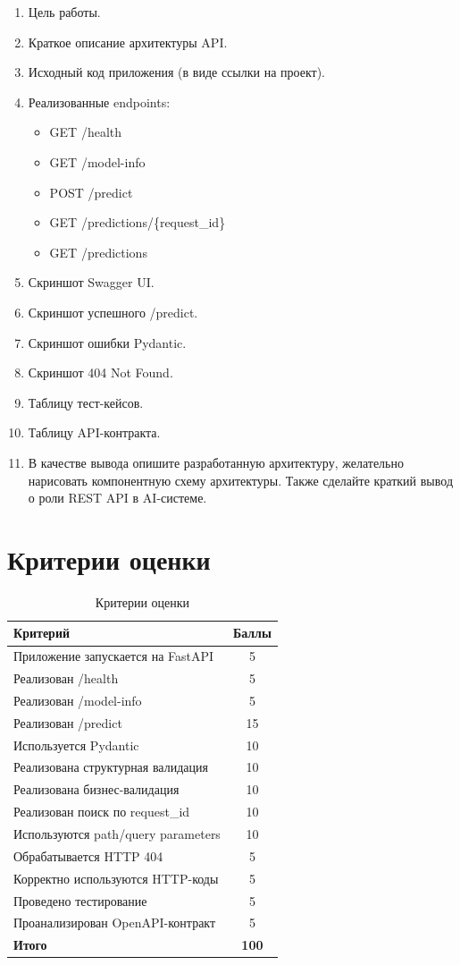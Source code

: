 \documentclass[12pt,a4paper]{article}
\begin{document}
\begin{enumerate}
    \item Цель работы.
    \item Краткое описание архитектуры API.
    \item Исходный код приложения (в виде ссылки на проект).
    \item Реализованные endpoints:
    \begin{itemize}
        \item GET /health
        \item GET /model-info
        \item POST /predict
        \item GET /predictions/\{request\_id\}
        \item GET /predictions
    \end{itemize}
    \item Скриншот Swagger UI.
    \item Скриншот успешного /predict.
    \item Скриншот ошибки Pydantic.
    \item Скриншот 404 Not Found.
    \item Таблицу тест-кейсов.
    \item Таблицу API-контракта.
    \item В качестве вывода опишите разработанную архитектуру, желательно нарисовать компонентную схему архитектуры. Также сделайте краткий вывод о роли REST API в AI-системе.
\end{enumerate}

\section{Критерии оценки}

\begin{table}[H]
\centering
\caption{Критерии оценки}
\label{tab:criteria}
\begin{tabular}{|p{10cm}|c|}
\hline
\textbf{Критерий} & \textbf{Баллы} \\
\hline
Приложение запускается на FastAPI & 5 \\
Реализован /health & 5 \\
Реализован /model-info & 5 \\
Реализован /predict & 15 \\
Используется Pydantic & 10 \\
Реализована структурная валидация & 10 \\
Реализована бизнес-валидация & 10 \\
Реализован поиск по request\_id & 10 \\
Используются path/query parameters & 10 \\
Обрабатывается HTTP 404 & 5 \\
Корректно используются HTTP-коды & 5 \\
Проведено тестирование & 5 \\
Проанализирован OpenAPI-контракт & 5 \\
\hline
\textbf{Итого} & \textbf{100} \\
\hline
\end{tabular}
\end{table}
\end{document}
